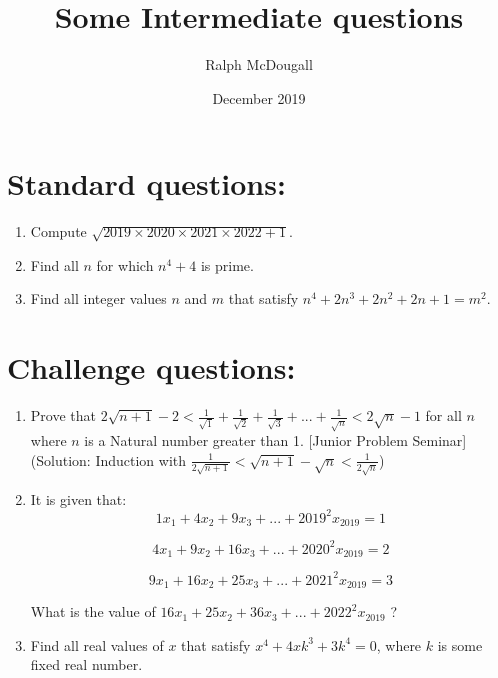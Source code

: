 \documentclass[a4paper,12pt]{article}
\begin{document}
\title {Some Intermediate questions}
\author{Ralph McDougall}
\date{December 2019}
\maketitle

\section{Standard questions:}

\begin{enumerate}
\item %
Compute $\sqrt{2019 \times 2020 \times 2021 \times 2022 + 1}$. 

\item %
Find all $n$ for which $n^4 + 4$ is prime.

\item %
Find all integer values $n$ and $m$ that satisfy $n^4 + 2n^3 + 2n^2 + 2n + 1 = m^2$. 


\end{enumerate}

\section{Challenge questions:}

\begin{enumerate}
\item %
Prove that $2\sqrt{n + 1} - 2 < \frac{1}{\sqrt{1}} + \frac{1}{\sqrt{2}} + \frac{1}{\sqrt{3}} + ... + \frac{1}{\sqrt{n}} < 2\sqrt{n} - 1$ for all $n$ where $n$ is a Natural number greater than 1. [Junior Problem Seminar] (Solution: Induction with $\frac{1}{2\sqrt{n + 1}} < \sqrt{n + 1} - \sqrt{n} < \frac{1}{2\sqrt{n}}$)

\item %
It is given that:
$$1x_1 + 4x_2 + 9x_3 + ... + 2019^2x_{2019} = 1$$

$$4x_1 + 9x_2 + 16x_3 + ... + 2020^2x_{2019} = 2$$

$$9x_1 + 16x_2 + 25x_3 + ... + 2021^2x_{2019} = 3$$

What is the value of $16x_1 + 25x_2 + 36x_3 + ... + 2022^2x_{2019}$ ?


\item %
Find all real values of $x$ that satisfy $x^4 + 4xk^3 + 3k^4 = 0$, where $k$ is some fixed real number.


\end{enumerate}
\end{document}
